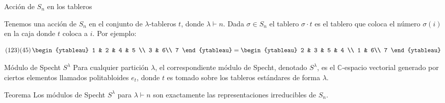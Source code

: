 \documentclass[final,xcolor=svgnames]{beamer}
\begin{document}
\begin{frame}{}
\begin{columns}
\begin{column}{0.5\textwidth}
      \begin{block}{Acción de $S_{n}$ en los tableros}
        \begin{minipage}{0.54\linewidth}
          Tenemos una acción de $S_{n}$ en el conjunto de
          $\lambda$-tableros $t$, donde $\lambda\vdash n$.  Dada
          $\sigma\in S_{n}$ el tablero $\sigma\cdot t$ es el tablero
          que coloca el número $\sigma(i)$ en la caja donde $t$ coloca
          a $i$.  Por ejemplo:
        \end{minipage}
        \begin{minipage}{0.42\linewidth}
          \centering
          \begin{equation*}(123)(45)\,
            \begin{ytableau}
              1 & 2 & 4 & 5 \\
              3 & 6\\
              7
            \end{ytableau}
            =
            \begin{ytableau}
              2 & 3 & 5 & 4 \\
              1 & 6\\
              7
            \end{ytableau}
          \end{equation*}
        \end{minipage}
      \end{block}

      \begin{block}{Módulo de Specht $S^{\lambda}$}
        Para cualquier partición $\lambda$, el correspondiente
        \alert{módulo de Specht}, denotado $S^{\lambda}$, es el
        $\mathbb{C}$-espacio vectorial generado por ciertos elementos llamados
        politabloides $e_{t}$, donde $t$ es tomado sobre los
        tableros estándares de forma
        $\lambda$.

      \end{block} 

       \begin{block}{Teorema}
         Los módulos de Specht $S^{\lambda}$ para $\lambda\vdash n$
         son exactamente las representaciones irreducibles de
         $S_{n}$.
     \end{block}


\end{column}
\end{columns}
\end{frame}
\end{document}
